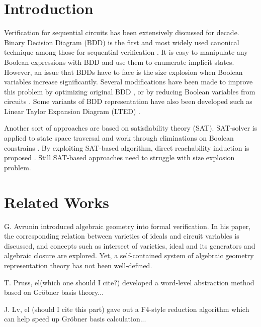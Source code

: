 \section{Introduction}
Verification for sequential circuits has been extensively discussed for decade. Binary Decision Diagram (BDD) is the first
and most widely used canonical technique among those for sequential verification \cite{touati1990implicit}. It is easy to
manipulate any Boolean expressions with BDD and use them to enumerate implicit states. However, an issue that BDDs have to
face is the size explosion when Boolean variables increase significantly. Several modifications have been made to improve
this problem by optimizing original BDD \cite{gunther2001application} \cite{narayan1997reachability}, or by reducing Boolean
variables from circuits\cite{burch1991representing} \cite{jiang2003verification}. Some variants of BDD representation
have also been developed such as Linear Taylor Expansion Diagram (LTED) \cite{alizadeh2009sequential}.

Another sort of approaches are based on satisfiability theory (SAT). SAT-solver is applied to state space traversal and 
work through eliminations on Boolean constrains \cite{coudert1990verification}. By exploiting SAT-based algorithm, direct
reachability induction is proposed \cite{bjesse2000sat}. Still SAT-based approaches need to struggle with size explosion problem.

\section{Related Works}
G. Avrunin \cite{avrunin1996symbolic} introduced algebraic geometry into formal verification. In his paper, the corresponding
relation between varieties of ideals and circuit variables is discussed, and concepts such as intersect of varieties, ideal and
its generators and algebraic closure are explored. Yet, a self-contained system of algebraic geometry representation theory has
not been well-defined.

T. Pruss, el(which one should I cite?) developed a word-level abstraction method based on  Gr\"obner basis theory...

J. Lv, el (should I cite this part) gave out a F4-style reduction algorithm which can help speed up Gr\"obner basis calculation...

